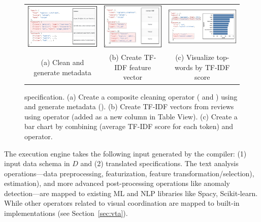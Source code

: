 \begin{figure}
\centering
\small
\begin{tabular}{ c c c}
  \includegraphics[width=0.3\linewidth,height=0.18\linewidth]{figures/combine_clean.pdf}   & 
  \includegraphics[width=0.3\linewidth,height=0.18\linewidth]{figures/tf_idf.pdf} & 
  \includegraphics[width=0.4\linewidth,height=0.18\linewidth]{figures/barchart.pdf} \\
     (a) Clean and generate metadata & 
     (b) Create TF-IDF feature vector &
     (c) Visualize top-words by TF-IDF score
\end{tabular}
    \caption{\small \vta specification. (a) Create a composite cleaning operator (  and ) using  and generate metadata (). (b) Create TF-IDF vectors from reviews using  operator (added as a new column in Table View). (c) Create a bar chart by combining  (average TF-IDF score for each token) and  operator.}
\vspace{-15pt}
    \label{fig:use-case-a}
\end{figure}

The \vita execution engine takes the following input generated by the \vta compiler: (1) input data schema in $D$ 
and (2) translated \vta specifications. The text analysis operations---data preprocessing,
featurization, 
feature transformation/selection),
estimation),
and more advanced post-processing operations
like anomaly detection---are mapped to existing ML and NLP libraries like Spacy, Scikit-learn. While other \vta operators related to visual coordination are mapped to built-in implementations (see Section~\ref{sec:vta}).

